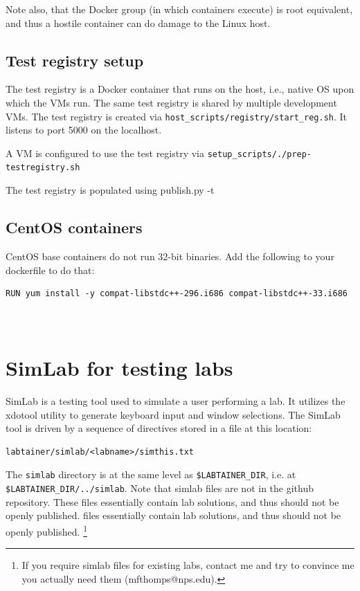 \documentclass[12pt]{article}
\begin{document}
Note also, that the Docker group (in which containers execute) is root 
equivalent, and thus a hostile container can do damage to the Linux host.

\subsection {Test registry setup}
The test registry is a Docker container that runs on the host, i.e., native OS
upon which the VMs run.  The same test registry is shared by multiple development VMs.
The test registry is created via {\tt host\_scripts/registry/start\_reg.sh}.  It listens
to port 5000 on the localhost.

A VM is configured to use the test registry via {\tt setup\_scripts/./prep-testregistry.sh}

The test registry is populated using publish.py -t

\subsection {CentOS containers}
CentOS base containers do not run 32-bit binaries.  Add the following to your dockerfile to do that:
\begin{verbatim}
RUN yum install -y compat-libstdc++-296.i686 compat-libstdc++-33.i686
\end{verbatim}

\newpage
\appendix
\section{\\SimLab for testing labs}
\label{testing}
SimLab is a testing tool used to simulate a user performing a lab.  
It utilizes the xdotool utility to
generate keyboard input and window selections.  The SimLab tool is driven by a 
sequence of directives stored in a file at this location:
\begin{verbatim}
labtainer/simlab/<labname>/simthis.txt
\end{verbatim}
The {\tt simlab} directory is at the same level as {\tt \$LABTAINER\_DIR}, i.e. at {\tt \$LABTAINER\_DIR/../simlab}.
Note that simlab files are not in the github repository.  These
files essentially contain lab solutions, and thus should not be openly published.
files essentially contain lab solutions, and thus should not be openly published.
\footnote{If you require simlab files for existing labs, contact me and try to convince
me you actually need them (mfthomps@nps.edu).}
\end{document}
